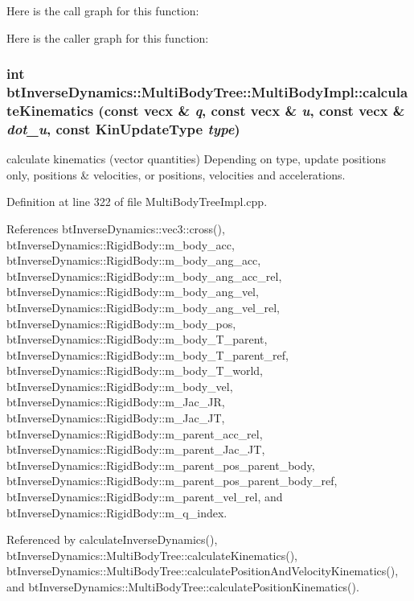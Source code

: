 Here is the call graph for this function:

Here is the caller graph for this function:\hypertarget{classbt_inverse_dynamics_1_1_multi_body_tree_1_1_multi_body_impl_32cb26dc4a94027f8206182f5a528bea}{
\subsubsection[calculateKinematics]{\setlength{\rightskip}{0pt plus 5cm}int btInverseDynamics::MultiBodyTree::MultiBodyImpl::calculateKinematics (const vecx \& {\em q}, \/  const vecx \& {\em u}, \/  const vecx \& {\em dot\_\-u}, \/  const KinUpdateType {\em type})}}
\label{classbt_inverse_dynamics_1_1_multi_body_tree_1_1_multi_body_impl_32cb26dc4a94027f8206182f5a528bea}


calculate kinematics (vector quantities) Depending on type, update positions only, positions \& velocities, or positions, velocities and accelerations. 

Definition at line 322 of file MultiBodyTreeImpl.cpp.

References btInverseDynamics::vec3::cross(), btInverseDynamics::RigidBody::m\_\-body\_\-acc, btInverseDynamics::RigidBody::m\_\-body\_\-ang\_\-acc, btInverseDynamics::RigidBody::m\_\-body\_\-ang\_\-acc\_\-rel, btInverseDynamics::RigidBody::m\_\-body\_\-ang\_\-vel, btInverseDynamics::RigidBody::m\_\-body\_\-ang\_\-vel\_\-rel, btInverseDynamics::RigidBody::m\_\-body\_\-pos, btInverseDynamics::RigidBody::m\_\-body\_\-T\_\-parent, btInverseDynamics::RigidBody::m\_\-body\_\-T\_\-parent\_\-ref, btInverseDynamics::RigidBody::m\_\-body\_\-T\_\-world, btInverseDynamics::RigidBody::m\_\-body\_\-vel, btInverseDynamics::RigidBody::m\_\-Jac\_\-JR, btInverseDynamics::RigidBody::m\_\-Jac\_\-JT, btInverseDynamics::RigidBody::m\_\-parent\_\-acc\_\-rel, btInverseDynamics::RigidBody::m\_\-parent\_\-Jac\_\-JT, btInverseDynamics::RigidBody::m\_\-parent\_\-pos\_\-parent\_\-body, btInverseDynamics::RigidBody::m\_\-parent\_\-pos\_\-parent\_\-body\_\-ref, btInverseDynamics::RigidBody::m\_\-parent\_\-vel\_\-rel, and btInverseDynamics::RigidBody::m\_\-q\_\-index.

Referenced by calculateInverseDynamics(), btInverseDynamics::MultiBodyTree::calculateKinematics(), btInverseDynamics::MultiBodyTree::calculatePositionAndVelocityKinematics(), and btInverseDynamics::MultiBodyTree::calculatePositionKinematics().

